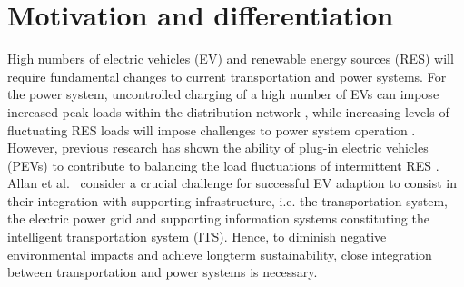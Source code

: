 \section{Motivation and differentiation}



High numbers of electric vehicles (EV) and renewable energy sources (RES) will require fundamental changes to current transportation and power systems. 
For the power system, uncontrolled charging of a high number of EVs can impose increased peak loads within the distribution network \cite{lopes2009identifying}, while increasing levels of fluctuating RES loads will impose challenges to power system operation \cite{heussen2012unified}. 
However, previous research has shown the ability of plug-in electric vehicles (PEVs) to contribute to balancing the load fluctuations of intermittent RES \cite{dallinger2012grid}. 
Allan et al.~\cite{allan2015benchmark} consider a crucial challenge for successful EV adaption to consist in their integration with supporting infrastructure, i.e. the transportation system, the electric power grid and supporting information systems constituting the intelligent transportation system (ITS). 
Hence, to diminish negative environmental impacts and achieve longterm sustainability, close integration between transportation and power systems is necessary.

